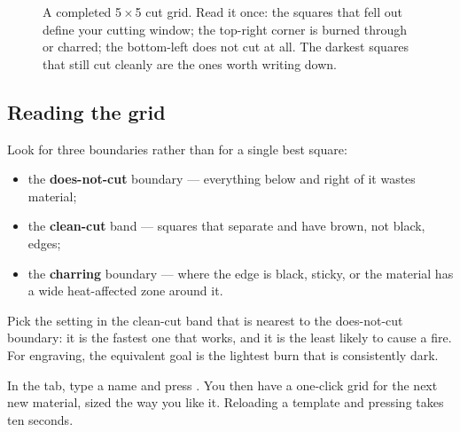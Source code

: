 \begin{figure}[htbp]
\centering
{}
\caption{A completed 5\,$\times$\,5 cut grid. Read it once: the squares that fell
out define your cutting window; the top-right corner is burned through or charred;
the bottom-left does not cut at all. The darkest squares that still cut cleanly
are the ones worth writing down.}
\label{fig:testgrid}
\end{figure}

\subsection*{Reading the grid}

Look for three boundaries rather than for a single best square:

\begin{itemize}
  \item the \textbf{does-not-cut} boundary --- everything below and right of it
        wastes material;
  \item the \textbf{clean-cut} band --- squares that separate and have brown, not
        black, edges;
  \item the \textbf{charring} boundary --- where the edge is black, sticky, or
        the material has a wide heat-affected zone around it.
\end{itemize}

\noindent Pick the setting in the clean-cut band that is nearest to the
does-not-cut boundary: it is the fastest one that works, and it is the least
likely to cause a fire. For engraving, the equivalent goal is the lightest burn
that is consistently dark.

\begin{tipbox}
In the  tab, type a name and press . You then have
a one-click grid for the next new material, sized the way you like it. Reloading
a template and pressing  takes ten seconds.
\end{tipbox}

